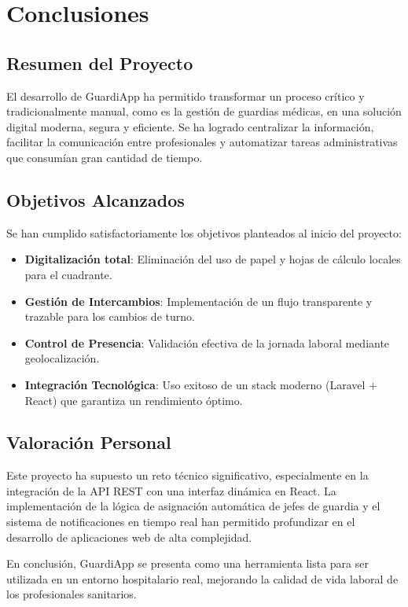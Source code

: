 \chapter{Conclusiones} \label{cap:conclusiones}

\section{Resumen del Proyecto}
El desarrollo de GuardiApp ha permitido transformar un proceso crítico y tradicionalmente manual, como es la gestión de guardias médicas, en una solución digital moderna, segura y eficiente. Se ha logrado centralizar la información, facilitar la comunicación entre profesionales y automatizar tareas administrativas que consumían gran cantidad de tiempo.

\section{Objetivos Alcanzados}
Se han cumplido satisfactoriamente los objetivos planteados al inicio del proyecto:
\begin{itemize}
    \item \textbf{Digitalización total}: Eliminación del uso de papel y hojas de cálculo locales para el cuadrante.
    \item \textbf{Gestión de Intercambios}: Implementación de un flujo transparente y trazable para los cambios de turno.
    \item \textbf{Control de Presencia}: Validación efectiva de la jornada laboral mediante geolocalización.
    \item \textbf{Integración Tecnológica}: Uso exitoso de un stack moderno (Laravel + React) que garantiza un rendimiento óptimo.
\end{itemize}

\section{Valoración Personal}
Este proyecto ha supuesto un reto técnico significativo, especialmente en la integración de la API REST con una interfaz dinámica en React. La implementación de la lógica de asignación automática de jefes de guardia y el sistema de notificaciones en tiempo real han permitido profundizar en el desarrollo de aplicaciones web de alta complejidad. 

En conclusión, GuardiApp se presenta como una herramienta lista para ser utilizada en un entorno hospitalario real, mejorando la calidad de vida laboral de los profesionales sanitarios.
